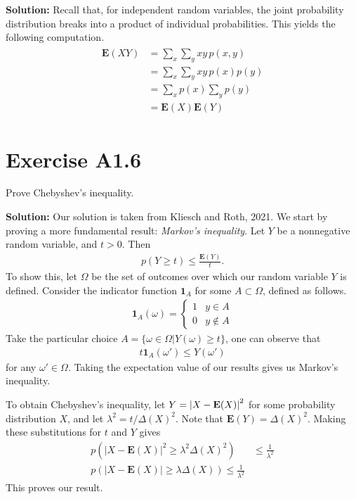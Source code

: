 \documentclass{book}
\begin{document}
    \textbf{Solution:} Recall that, for independent random variables, the joint probability distribution breaks into a product of individual probabilities. This yields the following computation.
    \begin{align}
    \begin{aligned}
        \textbf{E}(XY) &= \sum_x\sum_y xy\,p(x,y)\\
        &= \sum_x\sum_y xy\,p(x)p(y) \\
        &= \sum_x p(x) \sum_y p(y) \\
        &= \textbf{E}(X)\textbf{E}(Y)
    \end{aligned}
    \end{align}

\section*{Exercise A1.6}
    Prove Chebyshev's inequality.
    
    \textbf{Solution:} Our solution is taken from Kliesch and Roth, 2021. We start by proving  a more fundamental result: \emph{Markov's inequality}. Let $Y$ be a nonnegative random variable, and $t>0$. Then
    \begin{align}
        p(Y\geq t) \leq \frac{\textbf{E}(Y)}{t}.
    \end{align}
    To show this, let $\Omega$ be the set of outcomes over which our random variable $Y$ is defined. Consider the indicator function $\textbf{1}_A$ for some $A\subset\Omega$, defined as follows.
    \begin{align}
        \textbf{1}_A (\omega) = 
        \begin{cases}
            1 & y\in A \\
            0 & y \notin A
        \end{cases}
    \end{align}
    Take the particular choice $A = \{\omega\in \Omega| Y(\omega)\geq t\}$, one can observe that
    \begin{align}
        t \textbf{1}_A (\omega')\leq Y(\omega')
    \end{align}
    for any $\omega' \in \Omega$. Taking the expectation value of our results gives us Markov's inequality.
    
    To obtain Chebyshev's inequality, let $Y = \abs{X-\textbf{E}(X)}^2$ for some probability distribution $X$, and let $\lambda^2 = t/\Delta(X)^2$. Note that $\mathbf{E}(Y) = \Delta (X)^2$. Making these substitutions for $t$ and $Y$ gives
    \begin{align}
        p(|X-\mathbf{E}(X)|^2 \geq \lambda^2 \Delta(X)^2) &\leq \frac{1}{\lambda^2} \\
        p(|X-\mathbf{E}(X)|\geq \lambda\Delta(X)) \leq \frac{1}{\lambda^2}
    \end{align}
    This proves our result.
\end{document}
